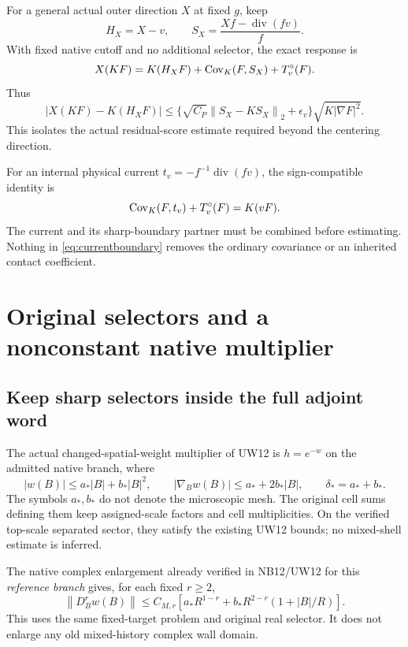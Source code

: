 \documentclass[11pt,letterpaper]{article}
\theoremstyle{remark}\newtheorem{remark}[theorem]{Remark}
\newcommand{\diver}{\operatorname{div}}\newcommand{\Ad}{\operatorname{Ad}}
\newcommand{\norm}[1]{\left\lVert#1\right\rVert}
\begin{document}
For a general actual outer direction $X$ at fixed $g$, keep
\[
 H_X=X-v,\qquad S_X=\frac{Xf-\diver(fv)}{f}.
\]
With fixed native cutoff and no additional selector, the exact response is
\[
 X(KF)=K(H_XF)+\operatorname{Cov}_K(F,S_X)+T_v^\circ(F).
\]
Thus
\begin{equation}\label{eq:bulkresponse}
 |X(KF)-K(H_XF)|
 \le
 \{\sqrt{C_P}\norm{S_X-KS_X}_2+\epsilon_v\}
       \sqrt{K|\nabla F|^2}.
\end{equation}
This isolates the actual residual-score estimate required beyond the centering direction.

For an internal physical current $t_v=-f^{-1}\diver(fv)$, the sign-compatible identity is
\begin{equation}\label{eq:currentboundary}
 \operatorname{Cov}_K(F,t_v)+T_v^\circ(F)=K(vF).
\end{equation}
The current and its sharp-boundary partner must be combined before estimating. Nothing in \eqref{eq:currentboundary} removes the ordinary covariance or an inherited contact coefficient.

\section{Original selectors and a nonconstant native multiplier}

\subsection{Keep sharp selectors inside the full adjoint word}

The actual changed-spatial-weight multiplier of UW12 is $h=e^{-w}$ on the admitted native branch, where
\begin{equation}\label{eq:wbound}
 |w(B)|\le a_*|B|+b_*|B|^2,\qquad
 |\nabla_Bw(B)|\le a_*+2b_*|B|,\qquad
 \delta_*=a_*+b_*.
\end{equation}
The symbols $a_*,b_*$ do not denote the microscopic mesh. The original cell sums defining them keep assigned-scale factors and cell multiplicities. On the verified top-scale separated sector, they satisfy the existing UW12 bounds; no mixed-shell estimate is inferred.

The native complex enlargement already verified in NB12/UW12 for this \emph{reference branch} gives, for each fixed $r\ge2$,
\[
 \norm{D_B^r w(B)}
 \le C_{M,r}\left[
       a_*R^{1-r}+b_*R^{2-r}(1+|B|/R)\right].
\]
This uses the same fixed-target problem and original real selector. It does not enlarge any old mixed-history complex wall domain.
\end{document}
